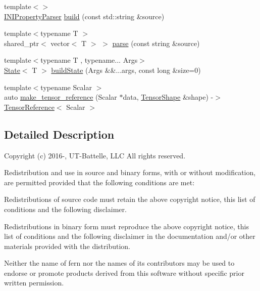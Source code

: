 \begin{DoxyCompactItemize}
\item 
{\footnotesize template$<$$>$ }\\\hyperlink{a00766}{I\+N\+I\+Property\+Parser} \hyperlink{a00171_a624f274bd6de1d7b829c9883ac3397cd}{build} (const std\+::string \&source)
\item 
{\footnotesize template$<$typename T $>$ }\\shared\+\_\+ptr$<$ vector$<$ T $>$ $>$ \hyperlink{a00171_a2b47cfd8a5d8711cdc55e1397487b90b}{parse} (const string \&source)
\item 
{\footnotesize template$<$typename T , typename... Args$>$ }\\\hyperlink{a00818}{State}$<$ T $>$ \hyperlink{a00171_afad7faa08ea9d4ad30b439b1d1719dd9}{build\+State} (Args \&\&...args, const long \&size=0)
\item 
{\footnotesize template$<$typename Scalar $>$ }\\auto \hyperlink{a00171_aaab26473f8b0cb78cff67ae06ff7ce80}{make\+\_\+tensor\+\_\+reference} (Scalar $\ast$data, \hyperlink{a00850}{Tensor\+Shape} \&shape) -\/$>$ \hyperlink{a00171_a1bf491fd1c876e2808648b2fd291e3dd}{Tensor\+Reference}$<$ Scalar $>$
\end{DoxyCompactItemize}


\subsection{Detailed Description}


 Copyright (c) 2016-\/, U\+T-\/\+Battelle, L\+LC All rights reserved.

Redistribution and use in source and binary forms, with or without modification, are permitted provided that the following conditions are met\+:

Redistributions of source code must retain the above copyright notice, this list of conditions and the following disclaimer.

Redistributions in binary form must reproduce the above copyright notice, this list of conditions and the following disclaimer in the documentation and/or other materials provided with the distribution.

Neither the name of fern nor the names of its contributors may be used to endorse or promote products derived from this software without specific prior written permission.

